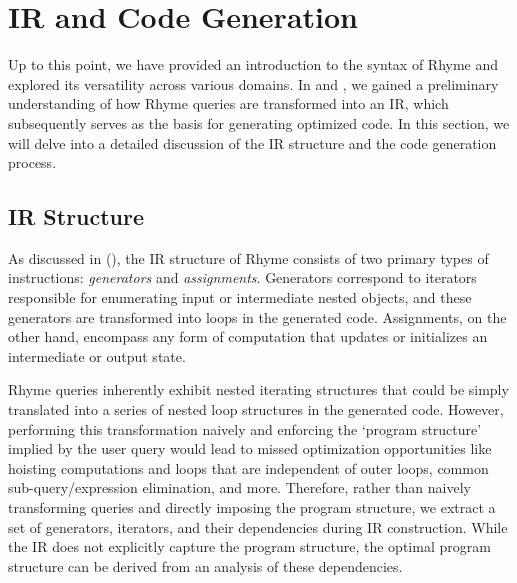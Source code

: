 \documentclass[runningheads]{llncs}
\newcommand{\lang}{Rhyme}
\begin{document}
\vspace{-3mm}
\section{IR and Code Generation}\label{sec:ir_codegen}
\vspace{-3mm}
Up to this point, we have provided an introduction to the syntax of
\lang{} and explored its versatility across various domains.
In  and , we gained a preliminary understanding
of how \lang{} queries are transformed into an IR, which subsequently serves
as the basis for generating optimized code.
In this section, we will delve into a detailed discussion of the IR structure
and the code generation process.

\vspace{-4mm}
\subsection{IR Structure}\label{subsec:ir}
As discussed in  (), the IR structure of \lang{} consists of two
primary types of instructions: \emph{generators} and \emph{assignments}.
Generators correspond to iterators responsible for enumerating input or intermediate
nested objects, and these generators are transformed into loops in the generated code.
Assignments, on the other hand, encompass any form of computation that updates or
initializes an intermediate or output state.

\lang{} queries inherently exhibit nested iterating structures that could be simply
translated into a series of nested loop structures in the generated code.
However, performing this transformation naively and enforcing the `program structure'
implied by the user query would lead to missed optimization opportunities like
hoisting computations and loops that are independent of outer loops,
common sub-query/expression elimination, and more.
Therefore, rather than naively transforming queries and directly imposing the program
structure, we extract a set of generators, iterators, and their dependencies during
IR construction.
While the IR does not explicitly capture the program structure, the optimal program
structure can be derived from an analysis of these dependencies.

\vspace{-4mm}
\end{document}
